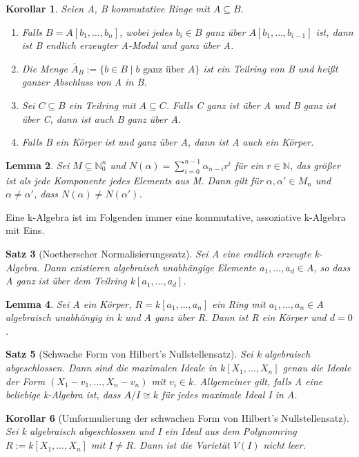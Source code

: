 \documentclass{article}
\newtheorem{satz}{Satz}
\newtheorem{lemma}[satz]{Lemma}
\newtheorem{korollar}[satz]{Korollar}
\begin{document}
	\begin{korollar}
	Seien A, B kommutative Ringe mit \(A \subseteq B\).
	\begin{enumerate}
	\item Falls \(B = A[b_1, \ldots, b_n]\), wobei jedes \(b_i \in B\) ganz über
	\(A[b_1, \ldots, b_{i-1}]\) ist, dann ist B endlich erzeugter A-Modul und 
	ganz über A.
	\item Die Menge \(\bar{A}_B := \{b \in B\;|\;b \text{ ganz über } A\}\) ist
	ein Teilring von B und heißt ganzer Abschluss von A in B.
	\item Sei \(C \subseteq B\) ein Teilring mit \(A \subseteq C\). Falls C
	ganz ist über A und B ganz ist über C, dann ist auch B ganz über A.
	\item Falls B ein Körper ist und ganz über A, dann ist A auch ein Körper.
	\end{enumerate}
	\end{korollar}

	\begin{lemma}\label{tupelvergleich}
	Sei \(M \subseteq \mathbb{N}^n_0\) und \(N(\alpha) = \sum^{n-1}_{i=0}
	\alpha_{n-i}r^i\) für ein \(r \in \mathbb{N}\), das größer ist
	als jede Komponente jedes Elements aus M. Dann gilt für \(\alpha, \alpha'
	\in M_n\) und \(\alpha \neq \alpha'\), dass \(N(\alpha) \neq N(\alpha')\).
	\end{lemma}

	Eine k-Algebra ist im Folgenden immer eine kommutative, assoziative
	k-Algebra mit Eins.

	\begin{satz}[Noetherscher Normalisierungssatz]
	Sei A eine endlich erzeugte k-Algebra. Dann existieren algebraisch
	unabhängige Elemente \(a_1, \ldots, a_d \in A\), so dass A ganz ist über
	dem Teilring \(k[a_1, \ldots, a_d]\).
	\end{satz}

	\begin{lemma}\label{hilfslemma}
	Sei A ein Körper, \(R = k[a_1, \ldots, a_n]\) ein Ring mit \(a_1, \ldots,
	a_n \in A\) algebraisch unabhängig in k und A ganz über R.
	Dann ist R ein Körper und \(d = 0\).
	\end{lemma}

	\begin{satz}[Schwache Form von Hilbert's Nullstellensatz]
	Sei k algebraisch abgeschlossen. Dann sind die maximalen Ideale in
	\(k[X_1, \ldots, X_n]\) genau die Ideale der Form \((X_1-v_1,\ldots,
	X_n-v_n)\) mit \(v_i \in k\). Allgemeiner gilt, falls A eine beliebige
	k-Algebra ist, dass \(A/I \cong k\) für jedes maximale Ideal I in A.
	\end{satz}

	\begin{korollar}[Umformulierung der schwachen Form von Hilbert's Nullstellensatz]
	Sei k algebraisch abgeschlossen und I ein Ideal aus dem Polynomring \(R :=
	k[X_1,\ldots,X_n]\) mit \(I \neq R\). Dann ist die Varietät \(V(I)\) nicht leer.
	\end{korollar}
\end{document}
